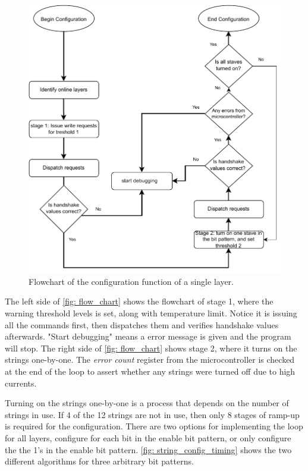 \documentclass[main.tex]{subfiles}
\begin{document}
\begin{figure}[!ht]
    \centering
    \includegraphics[width=12cm, scale=1.5]{images/new_config_chart.pdf}
    \caption{Flowchart of the configuration function of a single layer.}
    \label{fig: flow_chart}
\end{figure}
\FloatBarrier

The left side of \autoref{fig: flow_chart} shows the flowchart of stage 1, where the warning threshold levels is set, along with temperature limit. Notice it is issuing all the commands first, then dispatches them and verifies handshake values afterwards. "Start debugging" means a error message is given and the program will stop. The right side of \autoref{fig: flow_chart} shows stage 2, where it turns on the strings one-by-one. The \textit{error count} register from the microcontroller is checked at the end of the loop to assert whether any strings were turned off due to high currents.

Turning on the strings one-by-one is a process that depends on the number of strings in use. If 4 of the 12 strings are not in use, then only 8 stages of ramp-up is required for the configuration. There are two options for implementing the loop for all layers, configure for each bit in the enable bit pattern, or only configure the the 1's in the enable bit pattern. \autoref{fig: string_config_timing} shows the two different algorithms for three arbitrary bit patterns.
\end{document}
